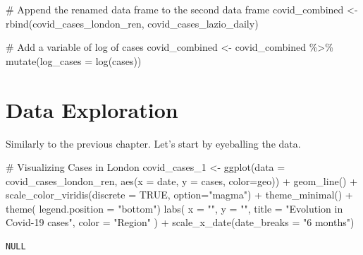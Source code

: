 \documentclass[
  letterpaper,
  DIV=11,
  numbers=noendperiod]{scrreprt}
\newenvironment{Shaded}{\begin{snugshade}}{\end{snugshade}}
\newcommand{\AttributeTok}[1]{\textcolor[rgb]{0.40,0.45,0.13}{#1}}
\newcommand{\CommentTok}[1]{\textcolor[rgb]{0.37,0.37,0.37}{#1}}
\newcommand{\ConstantTok}[1]{\textcolor[rgb]{0.56,0.35,0.01}{#1}}
\newcommand{\FunctionTok}[1]{\textcolor[rgb]{0.28,0.35,0.67}{#1}}
\newcommand{\NormalTok}[1]{\textcolor[rgb]{0.00,0.23,0.31}{#1}}
\newcommand{\OtherTok}[1]{\textcolor[rgb]{0.00,0.23,0.31}{#1}}
\newcommand{\SpecialCharTok}[1]{\textcolor[rgb]{0.37,0.37,0.37}{#1}}
\newcommand{\StringTok}[1]{\textcolor[rgb]{0.13,0.47,0.30}{#1}}
\begin{document}
\begin{Shaded}
\begin{Highlighting}[]
\CommentTok{\# Append the renamed data frame to the second data frame}
\NormalTok{covid\_combined }\OtherTok{\textless{}{-}} \FunctionTok{rbind}\NormalTok{(covid\_cases\_london\_ren, covid\_cases\_lazio\_daily)}

\CommentTok{\# Add a variable of log of cases}
\NormalTok{covid\_combined }\OtherTok{\textless{}{-}}\NormalTok{ covid\_combined }\SpecialCharTok{\%\textgreater{}\%} 
          \FunctionTok{mutate}\NormalTok{(}\AttributeTok{log\_cases =} \FunctionTok{log}\NormalTok{(cases))}
\end{Highlighting}
\end{Shaded}

\hypertarget{data-exploration}{%
\section{Data Exploration}\label{data-exploration}}

Similarly to the previous chapter. Let's start by eyeballing the data.

\begin{Shaded}
\begin{Highlighting}[]
\CommentTok{\# Visualizing Cases in London}
\NormalTok{covid\_cases\_1 }\OtherTok{\textless{}{-}} \FunctionTok{ggplot}\NormalTok{(}\AttributeTok{data =}\NormalTok{ covid\_cases\_london\_ren, }\FunctionTok{aes}\NormalTok{(}\AttributeTok{x =}\NormalTok{ date, }\AttributeTok{y =}\NormalTok{ cases, }\AttributeTok{color=}\NormalTok{geo)) }\SpecialCharTok{+}
  \FunctionTok{geom\_line}\NormalTok{() }\SpecialCharTok{+} 
  \FunctionTok{scale\_color\_viridis}\NormalTok{(}\AttributeTok{discrete =} \ConstantTok{TRUE}\NormalTok{, }\AttributeTok{option=}\StringTok{"magma"}\NormalTok{) }\SpecialCharTok{+}
  \FunctionTok{theme\_minimal}\NormalTok{() }\SpecialCharTok{+}
  \FunctionTok{theme}\NormalTok{(}
    \AttributeTok{legend.position =} \StringTok{"bottom"}\NormalTok{)}
  \FunctionTok{labs}\NormalTok{(}
    \AttributeTok{x =} \StringTok{""}\NormalTok{,}
    \AttributeTok{y =} \StringTok{""}\NormalTok{,}
    \AttributeTok{title =} \StringTok{"Evolution in Covid{-}19 cases"}\NormalTok{,}
    \AttributeTok{color =} \StringTok{"Region"}
\NormalTok{  ) }\SpecialCharTok{+}
  \FunctionTok{scale\_x\_date}\NormalTok{(}\AttributeTok{date\_breaks =} \StringTok{"6 months"}\NormalTok{)}
\end{Highlighting}
\end{Shaded}

\begin{verbatim}
NULL
\end{verbatim}
\end{document}
